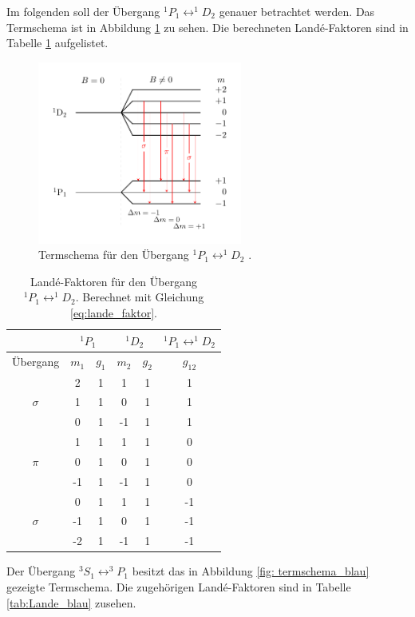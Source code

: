 Im folgenden soll der Übergang  $^1P_1\leftrightarrow ^1\!\!D_2$ genauer betrachtet werden.
Das Termschema ist in Abbildung \ref{fig: termschema_rot} zu sehen. Die berechneten Landé-Faktoren %
sind in Tabelle \ref{tab:Lande_rot} aufgelistet.

\FloatBarrier
\begin{figure}[h]
  \centering
  \includegraphics[width=0.6\textwidth]{pics/termschema_rot.pdf}
  \caption{Termschema für den Übergang $^1P_1\leftrightarrow ^1\!\!D_2$ \cite{luckyjosh}.}
  \label{fig: termschema_rot}
\end{figure}
\FloatBarrier
\FloatBarrier
\begin{table}
	\centering
  \caption{Landé-Faktoren für den Übergang $^1P_1\leftrightarrow ^1\!\!D_2$.  Berechnet mit Gleichung \eqref{eq:lande_faktor}.}
	\label{tab:Lande_rot}
	\begin{tabular}{cccccc}
		\toprule
		{} & \multicolumn{2}{c}{${}^1P_1$}  & \multicolumn{2}{c}{${}^1D_2$}  & $^1P_1\leftrightarrow ^1\!\!D_2$ \\
		\midrule
		 Übergang &   $m_1$  & $g_{1}$ & $m_2$ & $ g_2$  & $g_{12}$  \\
		\midrule
		& 2 & 1 & 1 & 1 & 1\\
		$\sigma$& 1 & 1 & 0 & 1 & 1\\
		& 0 & 1 & -1 & 1 & 1\\
		\midrule
		& 1 & 1 & 1 & 1 & 0\\
		$\pi$ & 0 & 1 & 0 & 1 & 0\\
		& -1 & 1 & -1 & 1 & 0\\
		\midrule
		& 0 & 1 & 1 & 1 & -1\\
		$\sigma$ & -1 & 1 & 0 & 1 & -1\\
		& -2 & 1 & -1 & 1 & -1\\\bottomrule
	\end{tabular}

\end{table}
\FloatBarrier
Der Übergang $^3S_1\leftrightarrow ^3\!\!P_1$ besitzt das in Abbildung \ref{fig: termschema_blau} gezeigte
Termschema. Die zugehörigen Landé-Faktoren sind in Tabelle \ref{tab:Lande_blau} zusehen. %



